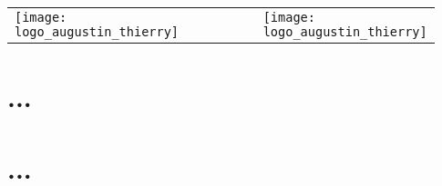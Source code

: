 \documentclass[12pt,oneside]{report}
\newcommand{\classe}{\seuro}
\newcommand{\documenttitle}{...}
\begin{document}

\begin{module}[colback=white]{\classe}
\vspace*{1em}
\begin{tabular}{m{0.15\linewidth}M{0.63\linewidth}R{0.15\linewidth}}
\texttt{[image: logo\_augustin\_thierry]}
&
\textcolor{blue}{\LARGE \bsc{\documenttitle}}
&
\texttt{[image: logo\_augustin\_thierry]}
\end{tabular}
\vspace*{0.2em}
\end{module}

\begin{spacing}{1.2}


\section{...}




\section{...}






\end{spacing}
\end{document}
